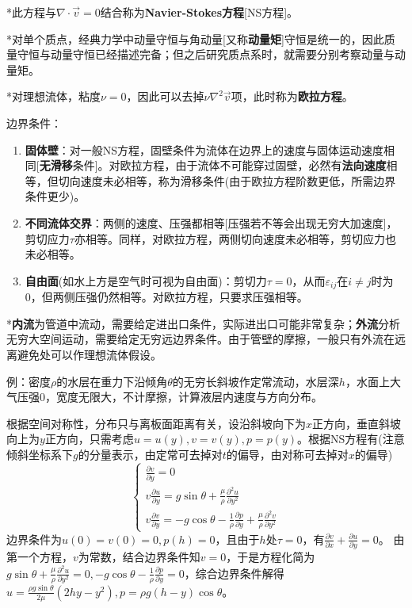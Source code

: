 \documentclass[a4paper,UTF8,fontset=windows]{ctexart}
\begin{document}
*此方程与$\nabla\cdot\vec{v}=0$结合称为\textbf{Navier-Stokes方程}[NS方程]。

*对单个质点，经典力学中动量守恒与角动量[又称\textbf{动量矩}]守恒是统一的，因此质量守恒与动量守恒已经描述完备；但之后研究质点系时，就需要分别考察动量与动量矩。

*对理想流体，粘度$\nu=0$，因此可以去掉$\nu\nabla^2\vec{v}$项，此时称为\textbf{欧拉方程}。

边界条件：
\begin{enumerate}
    \item \textbf{固体壁}：对一般NS方程，固壁条件为流体在边界上的速度与固体运动速度相同[\textbf{无滑移}条件]。对欧拉方程，由于流体不可能穿过固壁，必然有\textbf{法向速度}相等，但切向速度未必相等，称为滑移条件(由于欧拉方程阶数更低，所需边界条件更少)。
    \item \textbf{不同流体交界}：两侧的速度、压强都相等[压强若不等会出现无穷大加速度]，剪切应力$\tau$亦相等。同样，对欧拉方程，两侧切向速度未必相等，剪切应力也未必相等。
    \item \textbf{自由面}(如水上方是空气时可视为自由面)：剪切力$\tau=0$，从而$\varepsilon_{ij}$在$i\ne j$时为0，但两侧压强仍然相等。对欧拉方程，只要求压强相等。
\end{enumerate}

*\textbf{内流}为管道中流动，需要给定进出口条件，实际进出口可能非常复杂；\textbf{外流}分析无穷大空间运动，需要给定无穷远边界条件。由于管壁的摩擦，一般只有外流在远离避免处可以作理想流体假设。

例：密度$\rho$的水层在重力下沿倾角$\theta$的无穷长斜坡作定常流动，水层深$h$，水面上大气压强0，宽度无限大，不计摩擦，计算液层内速度与方向分布。

根据空间对称性，分布只与离板面距离有关，设沿斜坡向下为$x$正方向，垂直斜坡向上为$y$正方向，只需考虑$u=u(y),v=v(y),p=p(y)$。根据NS方程有(注意倾斜坐标系下$g$的分量表示，由定常可去掉对$t$的偏导，由对称可去掉对$x$的偏导)
$$\begin{cases}\frac{\partial v}{\partial y}=0\\v\frac{\partial u}{\partial y}=g\sin\theta+\frac{\mu}{\rho}\frac{\partial^2u}{\partial y^2}\\v\frac{\partial v}{\partial y}=-g\cos\theta-\frac{1}{\rho}\frac{\partial p}{\partial y}+\frac{\mu}{\rho}\frac{\partial^2v}{\partial y^2}\end{cases}$$
边界条件为$u(0)=v(0)=0,p(h)=0$，且由于$h$处$\tau=0$，有$\frac{\partial v}{\partial x}+\frac{\partial u}{\partial y}=0$。
由第一个方程，$v$为常数，结合边界条件知$v=0$，于是方程化简为$g\sin\theta+\frac{\mu}{\rho}\frac{\partial^2u}{\partial y^2}=0,-g\cos\theta-\frac{1}{\rho}\frac{\partial p}{\partial y}=0$，综合边界条件解得$u=\frac{\rho g\sin\theta}{2\mu}(2hy-y^2),p=\rho g(h-y)\cos\theta$。
\end{document}
